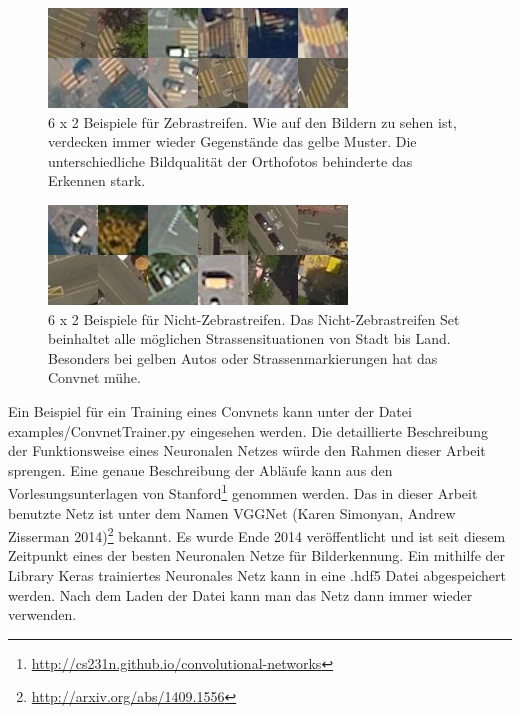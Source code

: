 \begin{figure}[H]
	\centering
	\includegraphics{images/Zebrastreifen_examples.png}
	\caption{6 x 2 Beispiele für Zebrastreifen. Wie auf den Bildern zu sehen ist, verdecken immer wieder Gegenstände das gelbe Muster. Die unterschiedliche Bildqualität der Orthofotos behinderte das Erkennen stark.}
\end{figure}

\begin{figure}[H]
	\centering
	\includegraphics{images/No_Zebrastreifen_examples.png}
	\caption{6 x 2 Beispiele für Nicht-Zebrastreifen. Das Nicht-Zebrastreifen Set beinhaltet alle möglichen Strassensituationen von Stadt bis Land. Besonders bei gelben Autos oder Strassenmarkierungen hat das Convnet mühe.}
\end{figure}

Ein Beispiel für ein Training eines Convnets kann unter der Datei examples/ConvnetTrainer.py eingesehen werden. Die detaillierte Beschreibung der Funktionsweise eines Neuronalen Netzes würde den Rahmen dieser Arbeit sprengen. Eine genaue Beschreibung der Abläufe kann aus den Vorlesungsunterlagen von Stanford\footnote{\url{http://cs231n.github.io/convolutional-networks}} genommen werden. Das in dieser Arbeit benutzte Netz ist unter dem Namen VGGNet (Karen Simonyan, Andrew Zisserman 2014)\footnote{\url{http://arxiv.org/abs/1409.1556}} bekannt. Es wurde Ende 2014 veröffentlicht und ist seit diesem Zeitpunkt eines der besten Neuronalen Netze für Bilderkennung. Ein mithilfe der Library Keras trainiertes Neuronales Netz kann in eine .hdf5 Datei abgespeichert werden. Nach dem Laden der Datei kann man das Netz dann immer wieder verwenden.

